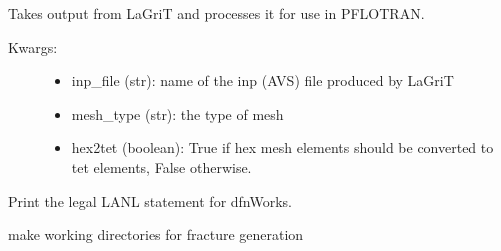 \documentclass[letterpaper,10pt,english]{sphinxmanual}
\begin{document}
\begin{fulllineitems}
\begin{fulllineitems}
\begin{fulllineitems}
\end{fulllineitems}


\end{fulllineitems}


\begin{fulllineitems}
\label{pydfnworks:pydfnworks.DFNWORKS.lagrit2pflotran}
Takes output from LaGriT and processes it for use in PFLOTRAN.
\begin{description}
\item[{Kwargs:}] \leavevmode\begin{itemize}
\item {} 
inp\_file (str): name of the inp (AVS) file produced by LaGriT

\item {} 
mesh\_type (str): the type of mesh

\item {} 
hex2tet (boolean): True if hex mesh elements should be converted to tet elements, False otherwise.

\end{itemize}

\end{description}

\end{fulllineitems}


\begin{fulllineitems}
\label{pydfnworks:pydfnworks.DFNWORKS.legal}
Print the legal LANL statement for dfnWorks.

\end{fulllineitems}


\begin{fulllineitems}
\label{pydfnworks:pydfnworks.DFNWORKS.make_working_directory}
make working directories for fracture generation

\end{fulllineitems}



\end{fulllineitems}
\end{document}
